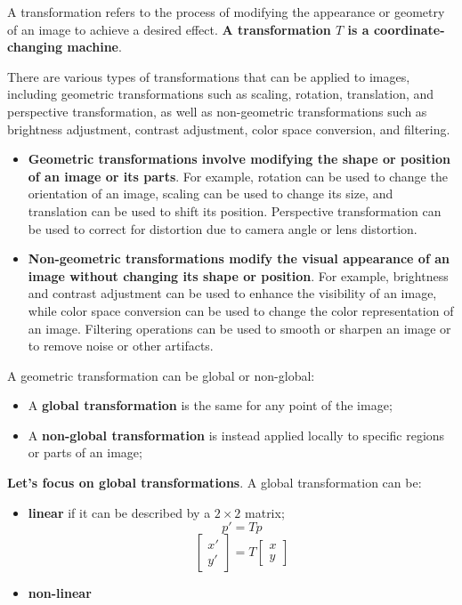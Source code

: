 \documentclass{article}
\begin{document}
A transformation refers to the process of modifying the appearance or geometry of an image to achieve a desired effect. \textbf{A transformation $T$ is a coordinate-changing machine}.

There are various types of transformations that can be applied to images, including geometric transformations such as scaling, rotation, translation, and perspective transformation, as well as non-geometric transformations such as brightness adjustment, contrast adjustment, color space conversion, and filtering.

\begin{itemize}
    \item \textbf{Geometric transformations involve modifying the shape or position of an image or its parts}. For example, rotation can be used to change the orientation of an image, scaling can be used to change its size, and translation can be used to shift its position. Perspective transformation can be used to correct for distortion due to camera angle or lens distortion.
\end{itemize}

\begin{itemize}
    \item \textbf{Non-geometric transformations modify the visual appearance of an image without changing its shape or position}. For example, brightness and contrast adjustment can be used to enhance the visibility of an image, while color space conversion can be used to change the color representation of an image. Filtering operations can be used to smooth or sharpen an image or to remove noise or other artifacts.
\end{itemize}

A geometric transformation can be global or non-global:
\begin{itemize}
    \item A \textbf{global transformation} is the same for any point of the image;
    \item A \textbf{non-global transformation} is instead applied locally to specific regions or parts of an image;
\end{itemize}

\textbf{Let's focus on global transformations}. A global transformation can be:
\begin{itemize}
    \item \textbf{linear} if it can be described by a $2\times 2$ matrix;
    \begin{equation*}
        p' = Tp
    \end{equation*}
    \begin{equation*}
        \begin{bmatrix}
            x' \\ y'
        \end{bmatrix}
        = T \begin{bmatrix}
            x \\ y
        \end{bmatrix}
    \end{equation*}
    \item \textbf{non-linear}
\end{itemize}
\end{document}
